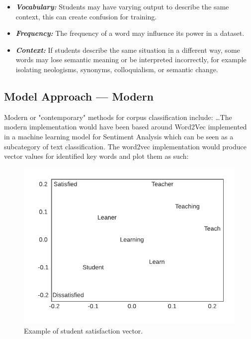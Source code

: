 \begin{itemize}
    \item \textbf{\textit{Vocabulary:}} Students may have varying output to describe the same context, this can create confusion for training.
    \item \textbf{\textit{Frequency:}} The frequency of a word may influence its power in a dataset.
    \item \textbf{\textit{Context:}} If students describe the same situation in a different way, some words may lose semantic meaning or be interpreted incorrectly, for example isolating neologisms, synonyms, colloquialism, or semantic change.
\end{itemize}

\subsection{Model Approach --- Modern}

Modern or "contemporary" methods for corpus classification include: \ldots The modern implementation would have been based around Word2Vec implemented in a machine learning model for Sentiment Analysis which can be seen as a subcategory of text classification. The word2vec implementation would produce vector values for identified key words and plot them as such:

\begin{figure}[H]
    \centering
    \includegraphics[width=\textwidth]{figures/chapter-5/Example-Word-Vector.pdf}
    \caption[ExampleWordVector]{Example of student satisfaction vector.
    \label{fig:Example-Word-Vector}}
\end{figure}

